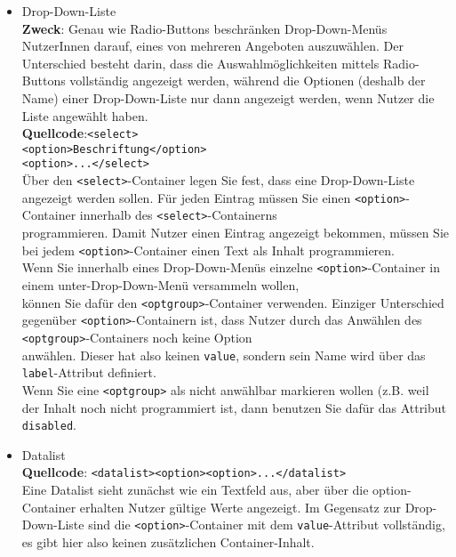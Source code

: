 \begin{itemize}
	\item Drop-Down-Liste\\
	\textbf{Zweck}: Genau wie Radio-Buttons beschränken Drop-Down-Menüs NutzerInnen darauf, eines von mehreren Angeboten auszuwählen. Der Unterschied besteht darin, dass die Auswahlmöglichkeiten mittels Radio-Buttons vollständig angezeigt werden, während die Optionen (deshalb der Name) einer Drop-Down-Liste nur dann angezeigt werden, wenn Nutzer die Liste angewählt haben.\\	
	\textbf{Quellcode}:\verb|<select>|\\\verb|<option>Beschriftung</option>|\\\verb|<option>...</select>|\\

	Über den \verb|<select>|-Container legen Sie fest, dass eine Drop-Down-Liste angezeigt werden sollen. Für jeden Eintrag müssen Sie einen \verb|<option>|-Container innerhalb des \verb|<select>|-Containerns \\programmieren. Damit Nutzer einen Eintrag angezeigt bekommen, müssen Sie bei jedem \verb|<option>|-Container einen Text als Inhalt programmieren.\\

	Wenn Sie innerhalb eines Drop-Down-Menüs einzelne \verb|<option>|-Container in einem unter-Drop-Down-Menü versammeln wollen, \\können Sie dafür den \verb|<optgroup>|-Container verwenden. Einziger Unterschied gegenüber \verb|<option>|-Containern ist, dass Nutzer durch das Anwählen des \verb|<optgroup>|-Containers noch keine Option \\anwählen. Dieser hat also keinen \verb|value|, sondern sein Name wird über das \verb|label|-Attribut definiert.\\

	Wenn Sie eine \verb|<optgroup>| als nicht anwählbar markieren wollen (z.B. weil der Inhalt noch nicht programmiert ist, dann benutzen Sie dafür das Attribut \verb|disabled|.\\

	\item Datalist\\
	\textbf{Quellcode}: \verb|<datalist><option><option>...</datalist>|\\
	Eine Datalist sieht zunächst wie ein Textfeld aus, aber über die option-Container erhalten Nutzer gültige Werte angezeigt. Im Gegensatz zur Drop-Down-Liste sind die \verb|<option>|-Container mit dem \verb|value|-Attribut vollständig, es gibt hier also keinen zusätzlichen Container-Inhalt.\\


\end{itemize}
